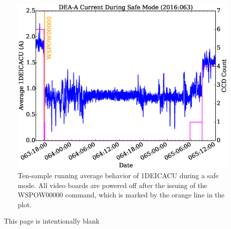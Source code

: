 \documentclass[11pt]{article}
\begin{document}
\begin{landscape}
\begin{figure}
\begin{center}
\includegraphics[width=1.2\textwidth]{deaa_on_fig2.eps}
\caption{Ten-sample running average behavior of 1DEICACU during a safe mode.
All video boards are powered off after the issuing of the WSPOW00000 command,
which is marked by the orange line in the plot.}
\end{center}
\end{figure}
\end{landscape}

\newpage\
\vspace{0.4\textheight}
\bc This page is intentionally blank \ec

\newcommand{\tablecaptiontext}{TURN ON DEA B (realtime version)}

\end{document}
